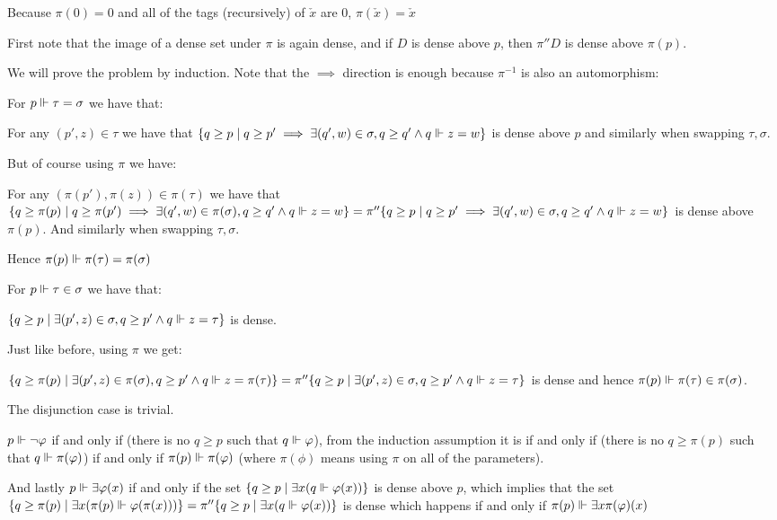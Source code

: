 \begin{cExercise}
	\begin{cPart}
		Because $\pi(0)=0$ and all of the tags (recursively) of $\check x$ are $0$, $\pi(\check x)=\check x$
	\end{cPart}
	\begin{cPart}
		First note that the image of a dense set under $\pi$ is again dense, and if $D$ is dense above $p$, then $\pi''D$ is dense above $\pi(p)$.
		
		We will prove the problem by induction. Note that the $\implies$ direction is enough because $\pi^{-1}$ is also an automorphism:
		
		For $p\Vdash \tau=\sigma$ we have that:
		
		For any $(p',z)\in \tau$ we have that $\{q\ge p\mid q\ge p'\implies \exists(q',w)\in\sigma, q\ge q'\land q\Vdash z=w\}$ is dense above $p$ and similarly when swapping $\tau,\sigma$.
		
		But of course using $\pi$ we have:
		
		For any $(\pi(p'),\pi(z))\in \pi(\tau)$ we have that $\{q\ge \pi(p)\mid q\ge \pi(p')\implies \exists(q',w)\in\pi(\sigma), q\ge q'\land q\Vdash z=w\}=\pi''\{q\ge p\mid q\ge p'\implies \exists(q',w)\in\sigma, q\ge q'\land q\Vdash z=w\}$ is dense above $\pi(p)$. And similarly when swapping $\tau,\sigma$.
		
		Hence $\pi(p)\Vdash \pi(\tau)=\pi(\sigma)$
		
		For $p\Vdash \tau\in\sigma$ we have that:
		
		$\{q\ge p\mid \exists(p',z)\in \sigma,q\ge p'\land q\Vdash z=\tau\}$ is dense.
		
		Just like before, using $\pi$ we get:
		
		$\{q\ge \pi(p)\mid \exists(p',z)\in \pi(\sigma),q\ge p'\land q\Vdash z=\pi(\tau)\}=\pi''\{q\ge p\mid \exists(p',z)\in \sigma,q\ge p'\land q\Vdash z=\tau\}$ is dense and hence $\pi(p)\Vdash \pi(\tau)\in\pi(\sigma)$.
		
		The disjunction case is trivial.
		
		$p\Vdash \lnot\varphi$ if and only if (there is no $q\ge p$ such that $q\Vdash \varphi$), from the induction assumption it is if and only if (there is no $q\ge \pi(p)$ such that $q\Vdash\pi(\varphi)$) if and only if $\pi(p)\Vdash\pi(\varphi)$ (where $\pi(\phi)$ means using $\pi$ on all of the parameters).
		
		And lastly $p\Vdash \exists \varphi(x)$ if and only if the set $\{q\ge p\mid \exists x(q\Vdash \varphi(x))\}$ is dense above $p$, which implies that the set $\{q\ge \pi(p)\mid \exists x(\pi(p)\Vdash \varphi(\pi(x)))\}=\pi''\{q\ge p\mid \exists x(q\Vdash \varphi(x))\}$ is dense which happens if and only if $\pi(p)\Vdash\exists x\pi(\varphi)(x)$
	\end{cPart}
\end{cExercise}
